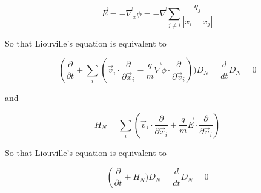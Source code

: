$$\vec{E} = -\vec{\nabla}_x\phi = -\vec{\nabla}\sum_{j\neq i} \frac{q_j}{|x_i - x_j|}$$

So that Liouville's equation is equivalent to

$$\left(\frac{\partial}{\partial t} + \sum_i \left(\vec{v}_i\cdot\frac{\partial}{\partial\vec{x}_i}  - \frac{q}{m}\vec{\nabla}\phi\cdot \frac{\partial}{\partial\vec{v}_i}\right))D_N = \frac{d}{dt}D_N = 0$$

and

$$H_N = \sum_i \left(\vec{v}_i\cdot\frac{\partial}{\partial\vec{x}_i}  + \frac{q}{m}\vec{E}\cdot \frac{\partial}{\partial\vec{v}_i}\right)$$

So that Liouville's equation is equivalent to

$$\left(\frac{\partial}{\partial t} + H_N)D_N = \frac{d}{dt}D_N = 0$$


















